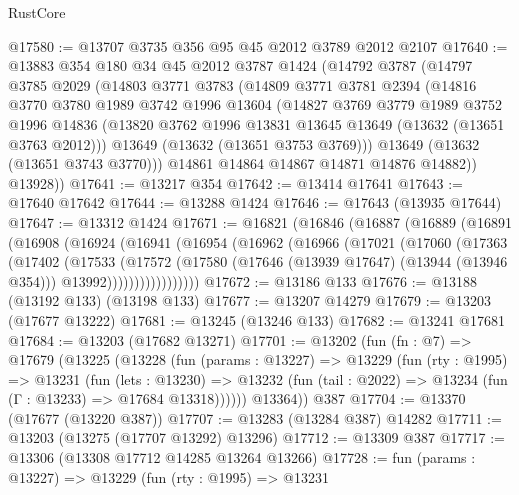 \begin{lexlean}{RustCore}
\begin{coremodule}
@17580 := @13707 @3735 @356 @95 @45 @2012 @3789 @2012 @2107
@17640 := @13883
    @354
    @180
    @34
    @45
    @2012
    @3787
    @1424
    (@14792
      @3787
      (@14797
        @3785
        @2029
        (@14803
          @3771
          @3783
          (@14809
            @3771
            @3781
            @2394
            (@14816
              @3770
              @3780
              @1989
              @3742
              @1996
              @13604
              (@14827
                @3769
                @3779
                @1989
                @3752
                @1996
                @14836
                (@13820 @3762 @1996 @13831 @13645 @13649 (@13632 (@13651 @3763 @2012)))
                @13649
                (@13632 (@13651 @3753 @3769)))
              @13649
              (@13632 (@13651 @3743 @3770)))
            @14861
            @14864
            @14867
            @14871
            @14876
            @14882))
        @13928))
@17641 := @13217 @354
@17642 := @13414 @17641
@17643 := @17640 @17642
@17644 := @13288 @1424
@17646 := @17643 (@13935 @17644)
@17647 := @13312 @1424
@17671 := @16821
    (@16846
      (@16887
        (@16889
          (@16891
            (@16908
              (@16924
                (@16941
                  (@16954
                    (@16962
                      (@16966
                        (@17021
                          (@17060
                            (@17363
                              (@17402
                                (@17533
                                  (@17572
                                    (@17580
                                      (@17646 (@13939 @17647) (@13944 (@13946 @354)))
                                      @13992)))))))))))))))))
@17672 := @13186 @133
@17676 := @13188 (@13192 @133) (@13198 @133)
@17677 := @13207 @14279
@17679 := @13203 (@17677 @13222)
@17681 := @13245 (@13246 @133)
@17682 := @13241 @17681
@17684 := @13203 (@17682 @13271)
@17701 := @13202
    (fun (fn : @7) =>
    @17679
      (@13225
        (@13228
          (fun (params : @13227) =>
          @13229
            (fun (rty : @1995) =>
            @13231
              (fun (lets : @13230) =>
              @13232 (fun (tail : @2022) => @13234 (fun (Γ : @13233) => @17684 @13318))))))
        @13364))
    @387
@17704 := @13370 (@17677 (@13220 @387))
@17707 := @13283 (@13284 @387) @14282
@17711 := @13203 (@13275 (@17707 @13292) @13296)
@17712 := @13309 @387
@17717 := @13306 (@13308 @17712 @14285 @13264 @13266)
@17728 := fun (params : @13227) =>
  @13229
    (fun (rty : @1995) =>
    @13231

\end{coremodule}
\end{lexlean}
